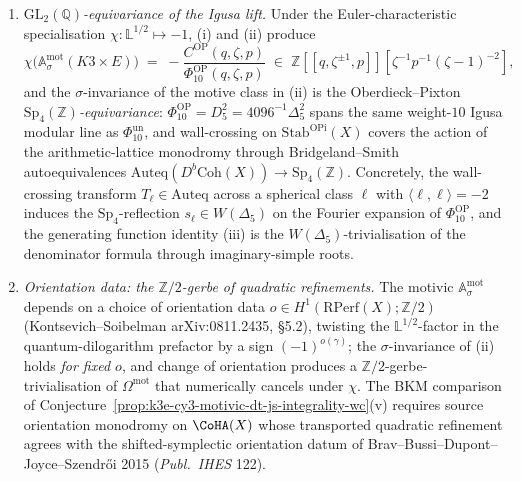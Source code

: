 \begin{conjecture}
\begin{enumerate}[label=\textup{(\roman*)},leftmargin=1.5em]
\[
 \Psi^{\mathrm{mot}} \colon \mathcal H_{\mathrm{mot}}(D^b\mathrm{Coh}(X)) \longrightarrow \mathbb T_\Lambda^{\mathrm{mot}},
 \qquad
 [\mathcal M_\gamma^{\sigma\text{-ss}}]_{\mathrm{mot}} \mapsto \Omega^{\mathrm{mot}}(\gamma; \sigma) \, e_\gamma,
\]
is a morphism of associative $K_0(\mathrm{MMHS})[\mathbb L^{\pm 1/2}]$-algebras (\emph{loc.\ cit.}\ Theorem~$6.1$), preserving the convolution product on motivic Hall-algebra classes. Equivalence $\sigma \sim \sigma'$ on $\mathrm{Stab}^{\mathrm{OPi}}(X)$ induces inner automorphisms of $\mathbb T_\Lambda^{\mathrm{mot}}$ by conjugation with $\Psi^{\mathrm{mot}}(1_{\mathcal M_\gamma^\sigma}/1_{\mathcal M_\gamma^{\sigma'}})$, and the $K_0$-class of $\mathbb A_\sigma^{\mathrm{mot}}$ is preserved.
\item \emph{$\mathrm{GL}_2(\mathbb Q)$-equivariance of the Igusa lift.} Under the Euler-characteristic specialisation $\chi \colon \mathbb L^{1/2} \mapsto -1$, (i) and (ii) produce
\[
 \chi\bigl( \mathbb A_\sigma^{\mathrm{mot}}(K3 \times E) \bigr)
 \;=\;
 -\frac{C^{\mathrm{OP}}(q, \zeta, p)}
 {\Phi_{10}^{\mathrm{OP}}(q, \zeta, p)}
 \;\in\; \mathbb Z[\![ q, \zeta^{\pm 1}, p ]\!][\zeta^{-1}p^{-1}(\zeta - 1)^{-2}],
\]
and the $\sigma$-invariance of the motive class in (ii) is the Oberdieck--Pixton \emph{$\mathrm{Sp}_4(\mathbb Z)$-equivariance}: \(\Phi_{10}^{\mathrm{OP}}=D_5^2=4096^{-1}\Delta_5^2\) spans the same weight-$10$ Igusa modular line as \(\Phi_{10}^{\mathrm{un}}\), and wall-crossing on $\mathrm{Stab}^{\mathrm{OPi}}(X)$ covers the action of the arithmetic-lattice monodromy through Bridgeland--Smith autoequivalences $\mathrm{Auteq}(D^b\mathrm{Coh}(X)) \to \mathrm{Sp}_4(\mathbb Z)$. Concretely, the wall-crossing transform $T_\ell \in \mathrm{Auteq}$ across a spherical class $\ell$ with $\langle \ell, \ell \rangle = -2$ induces the $\mathrm{Sp}_4$-reflection $s_\ell \in W(\Delta_5)$ on the Fourier expansion of $\Phi_{10}^{\mathrm{OP}}$, and the generating function identity (iii) is the $W(\Delta_5)$-trivialisation of the denominator formula through imaginary-simple roots.
\item \emph{Orientation data: the $\mathbb Z/2$-gerbe of quadratic refinements.} The motivic $\mathbb A_\sigma^{\mathrm{mot}}$ depends on a choice of orientation data $o \in H^1(\mathrm{RPerf}(X); \mathbb Z/2)$ (Kontsevich--Soibelman arXiv:0811.2435, \S 5.2), twisting the $\mathbb L^{1/2}$-factor in the quantum-dilogarithm prefactor by a sign $(-1)^{o(\gamma)}$; the $\sigma$-invariance of (ii) holds \emph{for fixed $o$}, and change of orientation produces a $\mathbb Z/2$-gerbe-trivialisation of $\Omega^{\mathrm{mot}}$ that numerically cancels under $\chi$. The BKM comparison of Conjecture~\ref{prop:k3e-cy3-motivic-dt-js-integrality-wc}(v) requires source orientation monodromy on $\CoHA(X)$ whose transported quadratic refinement agrees with the shifted-symplectic orientation datum of Brav--Bussi--Dupont--Joyce--Szendr\H oi 2015 (\emph{Publ.\ IHES} 122).
\end{enumerate}
\end{conjecture}

